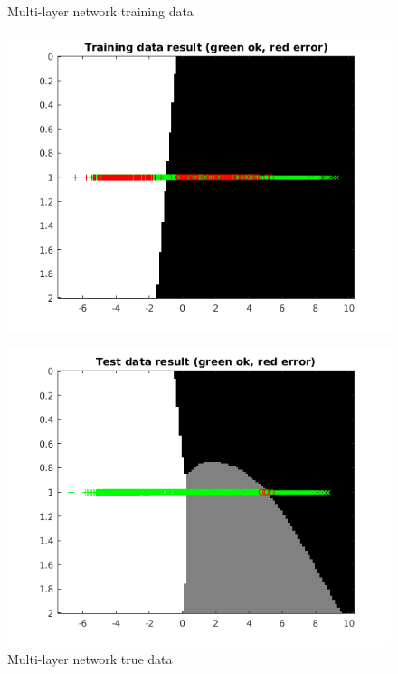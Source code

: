 \documentclass[a4paper,12pt]{article}
\begin{document}
\begin{figure}[H]
\centering
  \begin{minipage}[]{0.49\textwidth}
  \caption{Multi-layer network training data}\label{fig:non_generalizable_train}
  \includegraphics[width=\textwidth]{figures/non_generalizable_train.png}
  \end{minipage}
  \begin{minipage}[]{0.49\textwidth}
  \caption{Multi-layer network true data}\label{fig:non_generalizable_test}
  \includegraphics[width=\textwidth]{figures/non_generalizable_true.png}
  \end{minipage}
\end{figure}
\end{document}

